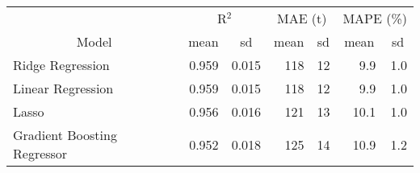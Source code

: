
\begin{tabular}[t]{lrrrrrr}
\toprule
\multicolumn{1}{c}{ } & \multicolumn{2}{c}{R$^2$} & \multicolumn{2}{c}{MAE (t)} & \multicolumn{2}{c}{MAPE (\%)} \\
\cmidrule(l{3pt}r{3pt}){2-3} \cmidrule(l{3pt}r{3pt}){4-5} \cmidrule(l{3pt}r{3pt}){6-7}
\multicolumn{1}{c}{Model} & \multicolumn{1}{c}{mean} & \multicolumn{1}{c}{sd} & \multicolumn{1}{c}{mean} & \multicolumn{1}{c}{sd} & \multicolumn{1}{c}{mean} & \multicolumn{1}{c}{sd}\\
\midrule
Ridge Regression & 0.959 & 0.015 & 118 & 12 & 9.9 & 1.0\\
Linear Regression & 0.959 & 0.015 & 118 & 12 & 9.9 & 1.0\\
Lasso & 0.956 & 0.016 & 121 & 13 & 10.1 & 1.0\\
Gradient Boosting Regressor & 0.952 & 0.018 & 125 & 14 & 10.9 & 1.2\\
\bottomrule
\end{tabular}
